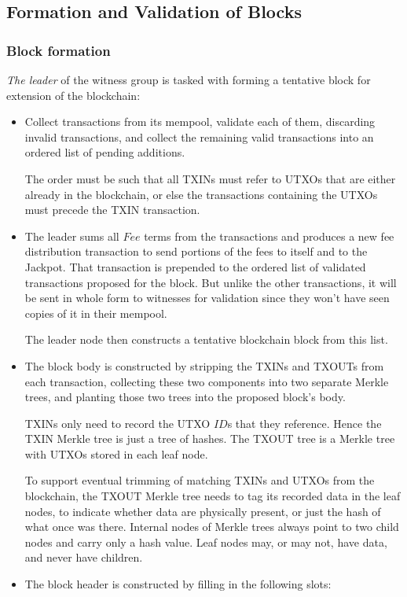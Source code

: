 \documentclass[a4paper, 10pt, conference]{ieeeconf}
\begin{document}
\subsection{Formation and Validation of Blocks}

\subsubsection{Block formation} \textit{The leader} of the witness group is tasked with forming a tentative block for extension of the blockchain:

\begin{itemize}
	\item {Collect transactions from its mempool, validate each of them, discarding invalid transactions, and collect the remaining valid transactions into an ordered list of pending additions.

	The order must be such that all TXINs must refer to UTXOs that are either already in the blockchain, or else the transactions containing the UTXOs must precede the TXIN transaction.}
	\item {The leader sums all $Fee$ terms from the transactions and produces a new fee distribution transaction to send portions of the fees to itself and to the Jackpot. That transaction is prepended to the ordered list of validated transactions proposed for the block. But unlike the other transactions, it will be sent in whole form to witnesses for validation since they won't have seen copies of it in their mempool.

	The leader node then constructs a tentative blockchain block from this list.}
	\item {The block body is constructed by stripping the TXINs and TXOUTs from each transaction, collecting these two components into two separate Merkle trees, and planting those two trees into the proposed block's body.

	TXINs only need to record the UTXO $ID$s that they reference. Hence the TXIN Merkle tree is just a tree of hashes. The TXOUT tree is a Merkle tree with UTXOs stored in each leaf node.

	To support eventual trimming of matching TXINs and UTXOs from the blockchain, the TXOUT Merkle tree needs to tag its recorded data in the leaf nodes, to indicate whether data are physically present, or just the hash of what once was there. Internal nodes of Merkle trees always point to two child nodes and carry only a hash value. Leaf nodes may, or may not, have data, and never have children.}
	\item {The block header is constructed by filling in the following slots:

}
\end{itemize}
\end{document}

